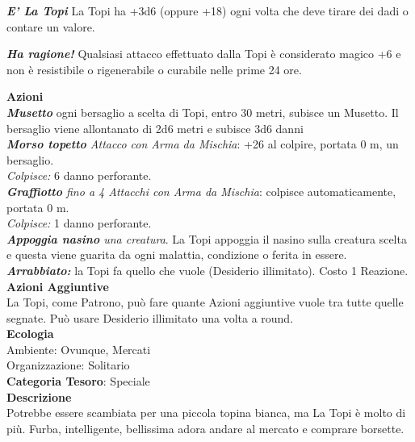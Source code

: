 \begin{multicols}{2}
{\emph{\textbf{E' La Topi}} La Topi ha +3d6 (oppure +18) ogni volta che deve tirare dei dadi o contare un valore.

\emph{\textbf{Ha ragione!}} Qualsiasi attacco effettuato dalla Topi è considerato magico +6 e non è resistibile o rigenerabile o curabile nelle prime 24 ore.

\smallskip

\textbf{Azioni}\\
\emph{\textbf{Musetto}} ogni bersaglio a scelta di Topi, entro 30 metri, subisce un Musetto. Il bersaglio viene allontanato di 2d6 metri e subisce 3d6 danni\\
\emph{\textbf{Morso topetto} Attacco con Arma da Mischia}: +26 al colpire, portata 0 m, un bersaglio.\\
\emph{Colpisce:} 6 danno perforante.\\
\emph{\textbf{Graffiotto} fino a 4 Attacchi con Arma da Mischia}: colpisce  automaticamente, portata 0 m.\\
\emph{Colpisce:} 1 danno perforante.\\
\emph{\textbf{Appoggia nasino} una creatura}. La Topi appoggia il nasino sulla creatura scelta e questa viene guarita da ogni malattia, condizione o ferita in essere.\\
\emph{\textbf{Arrabbiato:}} la Topi fa quello che vuole (Desiderio illimitato). Costo 1 Reazione.\\
\textbf{Azioni Aggiuntive}\\
La Topi, come Patrono, può fare quante Azioni aggiuntive vuole tra tutte quelle segnate. Può usare Desiderio illimitato una volta a round.\\
\textbf{Ecologia}\\
Ambiente: Ovunque, Mercati\\
Organizzazione: Solitario\\
\textbf{Categoria Tesoro}: Speciale\\
\textbf{Descrizione}\\
Potrebbe essere scambiata per una piccola topina bianca, ma La Topi è molto di più. Furba, intelligente, bellissima adora andare al mercato e comprare borsette.

}
\end{multicols}
